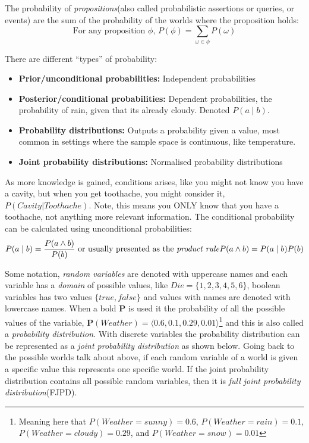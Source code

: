 \documentclass[11pt, letterpaper]{report}
\numberwithin{equation}{section}
\begin{document}
The probability of \emph{propositions}(also called probabilistic assertions or queries,
or events) are the sum of the probability of the worlds where the proposition
holds:
\begin{equation}
  \label{eq:proposition}
  \text{For any proposition $\phi$, }P(\phi) = \sum_{\omega \in \phi} P(\omega)
\end{equation}


There are different ``types'' of probability:
\begin{itemize}[label={}]
\item \textbf{Prior/unconditional  probabilities: } Independent probabilities
\item \textbf{Posterior/conditional probabilities: } Dependent probabilities,
  the probability of rain, given that its already cloudy. Denoted $P(a \mid b)$.
\item \textbf{Probability distributions: } Outputs a probability given a value,
  most common in settings where the sample space is continuous, like temperature.
\item \textbf{Joint probability  distributions: } Normalised probability distributions
\end{itemize}
As more knowledge is gained, conditions arises, like you might not know you have
a cavity, but when you get toothache, you might consider it, $P(Cavity |
Toothache )$. Note, this means you ONLY know that you have a toothache, not
anything more relevant information. The conditional probability can be
calculated using unconditional probabilities:
\begin{equation}
  \label{eq:prodrule}
  P(a \mid b) = \frac{P(a \wedge b)}{P(b)} \text{ or usually presented as the \emph{product rule}}
  P(a \wedge b) = P(a \mid b)P(b)
\end{equation}

Some notation, \emph{random variables} are denoted with uppercase names and each
variable has a \emph{domain} of possible values, like $Die = \{1,2,3,4,5,6\}$,
boolean variables has two values $\{true, false\}$ and values with names are
denoted with lowercase names. When a bold $\boldsymbol{P}$ is used it the probability of all
the possible values of the variable, $\boldsymbol{P}(Weather) = \langle 0.6,0.1,
0.29, 0.01 \rangle$\footnote{Meaning here that $P(Weather = sunny) = 0.6$,
  $P(Weather = rain) = 0.1$, $P(Weather = cloudy) = 0.29$, and $P(Weather =
  snow) = 0.01$} and this is also called a \emph{probability distribution}. With
discrete variables the probability distribution can be represented as a
\emph{joint probability distribution} as shown below. Going back to the possible
worlds talk about above, if each random variable of a world is given a specific
value this represents one specific world. If the joint probability distribution
contains all possible random variables, then it is \emph{full joint probability distribution}(FJPD).
\end{document}
